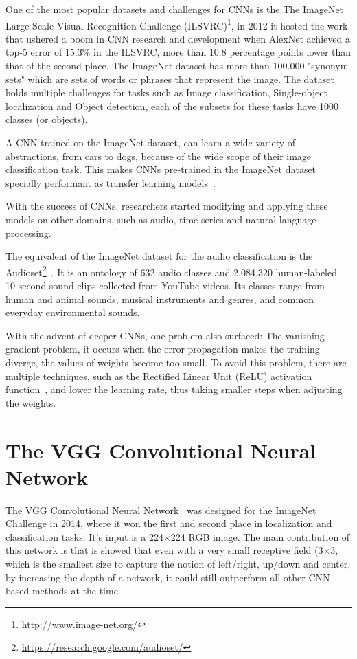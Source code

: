 One of the most popular datasets and challenges for CNNs is the The ImageNet Large Scale Visual Recognition Challenge (ILSVRC)\footnote{\url{http://www.image-net.org/}}\cite{deng2009imagenet}, in 2012 it hosted the work that ushered a boom in CNN research and development when AlexNet achieved a top-5 error of 15.3\% in the ILSVRC, more than 10.8 percentage points lower than that of the second place. The ImageNet dataset has more than 100.000 "synonym sets" which are sets of words or phrases that represent the image. The dataset holds multiple challenges for tasks such as Image classification, Single-object localization and Object detection, each of the subsets for these tasks have 1000 classes (or objects).

A CNN trained on the ImageNet dataset, can learn a wide variety of abstractions, from cars to dogs, because of the wide scope of their image classification task. This makes CNNs pre-trained in the ImageNet dataset specially performant as transfer learning models~\cite{huh2016makes}.

With the success of CNNs, researchers started modifying and applying these models on other domains, such as audio, time series and natural language processing.

The equivalent of the ImageNet dataset for the audio classification is the Audioset\footnote{\url{https://research.google.com/audioset/}}~\cite{gemmeke2017audioset}. It is an ontology of 632 audio classes and 2,084,320 human-labeled 10-second sound clips collected from YouTube videos. Its classes range from human and animal sounds, musical instruments and genres, and common everyday environmental sounds.

With the advent of deeper CNNs, one problem also surfaced: The vanishing gradient problem, it occurs when the error propagation makes the training diverge, the values of weights become too small. To avoid this problem, there are multiple techniques, such as the Rectified Linear Unit (ReLU) activation function~\cite{krizhevsky2012relu}, and lower the learning rate, thus taking smaller steps when adjusting the weights.

\section{The VGG Convolutional Neural Network}\label{sec:VGGish}

The VGG Convolutional Neural Network~\cite{simonyan2014VGG} was designed for the ImageNet Challenge in 2014, where it won the first and second place in localization and classification tasks. It's input is a 224$\times$224 RGB image. The main contribution of this network is that is showed that even with a very small receptive field (3$\times$3, which is the smallest size to capture the notion of left/right, up/down and center, by increasing the depth of a network, it could still outperform all other CNN based methods at the time.

